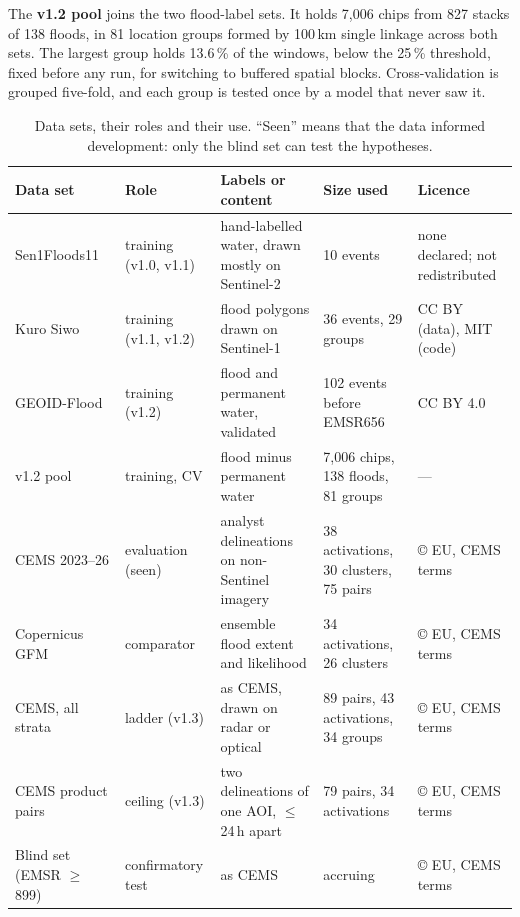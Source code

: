 \documentclass[10pt,twocolumn,a4paper]{article}
\newcommand{\pp}{\,\%}
\begin{document}
The \textbf{v1.2 pool} joins the two flood-label sets. It holds 7,006 chips from 827 stacks of 138 floods, in 81
location groups formed by 100\,km single linkage across both sets. The largest group holds 13.6\pp{} of the windows,
below the 25\pp{} threshold, fixed before any run, for switching to buffered spatial blocks. Cross-validation is
grouped five-fold, and each group is tested once by a model that never saw it.

\begin{table}[t]
\centering\small
\caption{Data sets, their roles and their use. ``Seen'' means that the data informed development: only the blind set
can test the hypotheses.}
\label{tab:data}
\begin{tabularx}{\textwidth}{@{}l l X p{3.9cm} p{3.2cm}@{}}
\toprule
Data set & Role & Labels or content & Size used & Licence \\
\midrule
Sen1Floods11~\citep{bonafilia2020sen1floods11} & training (v1.0, v1.1) & hand-labelled water, drawn mostly on Sentinel-2
  & 10 events & none declared; not redistributed \\
Kuro Siwo~\citep{bountos2024kurosiwo} & training (v1.1, v1.2) & flood polygons drawn on Sentinel-1
  & 36 events, 29 groups & CC BY (data), MIT (code) \\
GEOID-Flood~\citep{chiriaco2026geoid} & training (v1.2) & flood and permanent water, validated
  & 102 events before EMSR656 & CC BY 4.0 \\
v1.2 pool & training, CV & flood minus permanent water & 7,006 chips, 138 floods, 81 groups & --- \\
CEMS 2023--26 & evaluation (seen) & analyst delineations on non-Sentinel imagery
  & 38 activations, 30 clusters, 75 pairs & \copyright{} EU, CEMS terms \\
Copernicus GFM & comparator & ensemble flood extent and likelihood & 34 activations, 26 clusters
  & \copyright{} EU, CEMS terms \\
CEMS, all strata & ladder (v1.3) & as CEMS, drawn on radar or optical
  & 89 pairs, 43 activations, 34 groups & \copyright{} EU, CEMS terms \\
CEMS product pairs & ceiling (v1.3) & two delineations of one AOI, $\leq$\,24\,h apart
  & 79 pairs, 34 activations & \copyright{} EU, CEMS terms \\
Blind set (EMSR $\geq$ 899) & confirmatory test & as CEMS & accruing & \copyright{} EU, CEMS terms \\
\bottomrule
\end{tabularx}
\end{table}
\end{document}
